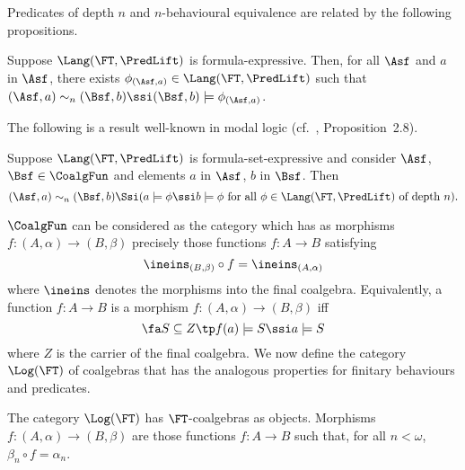 \documentclass{entcs}
\begin{document}
Predicates of depth $n$ and $n$-behavioural equivalence are related by the
following propositions. 


\begin{prop}
  Suppose $\Lang(\FT,\PredLift)$ is formula-expressive.
  Then, for all $\Asf$ and
  $a$ in $\Asf$, there exists $\phi_{(\Asf,a)}\in\Lang(\FT,\PredLift)$
  such that $(\Asf,a)\sim_n(\Bsf,b)\ssi (\Bsf,b)\models\phi_{(\Asf,a)}$.
\end{prop}

The following is a result well-known in modal logic (cf.\ 
\cite{gerbrandy:diss}, Proposition~2.8). 

\begin{prop}\label{prop:bounden-beh-equ-ml}
  Suppose $\Lang(\FT,\PredLift)$ is formula-set-expressive and
  consider $\Asf$, $\Bsf \in \CoalgFun$ and elements $a$ in $\Asf$,
  $b$ in $\Bsf$. Then $$(\Asf,a)\sim_n(\Bsf,b) \Ssi (a\models\phi\ssi
  b\models\phi \text{ for all $\phi\in \Lang(\FT,\PredLift)$ of depth
    $n$}).$$
\end{prop}

\mmskip $\CoalgFun$ can be considered as the category which has as
morphisms $f:(A,\alpha)\to (B,\beta)$ precisely those functions
$f:A\to B$ satisfying 
%
$$\ineins_{(B,\beta)}\circ f = \ineins_{(A,\alpha)}$$
%
where $\ineins$ denotes the morphisms into the final coalgebra.
Equivalently, a function $f:A\to B$ is a morphism $f:(A,\alpha)\to
(B,\beta)$ iff
%
$$\fa S\subseteq Z\tp f(a)\models S \ssi a\models S$$
%
where $Z$ is the carrier of the final coalgebra.
We now define the category $\Log(\FT)$ of coalgebras that has the
analogous properties for finitary behaviours and predicates.

\begin{defn}[$\Log(\FT)$]\label{def:log}
  The category $\Log(\FT)$ has $\FT$-coalgebras as objects. Morphisms
  $f:(A,\alpha)\to (B,\beta)$ are those functions $f:A\to B$ such that,
  for all $n<\omega$,
%
$\beta_n\circ f = \alpha_n$.
%
\end{defn}
\end{document}
